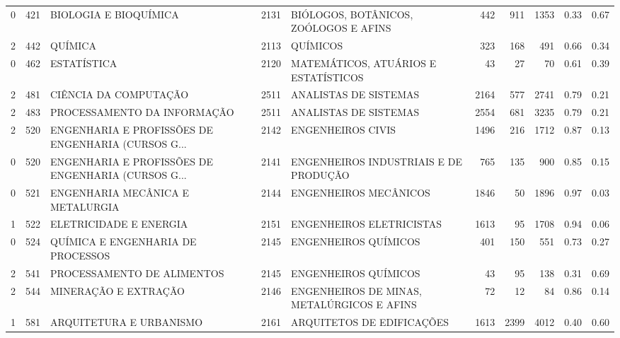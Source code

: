\begin{table}
\begin{tabular}{rrlrlrrrrr}
       0 &    421 &                              BIOLOGIA E BIOQUÍMICA & 2131 &              BIÓLOGOS, BOTÂNICOS, ZOÓLOGOS E AFINS &   442 &   911 &   1353 & 0.33 & 0.67 \\
       2 &    442 &                                            QUÍMICA & 2113 &                                           QUÍMICOS &   323 &   168 &    491 & 0.66 & 0.34 \\
       0 &    462 &                                        ESTATÍSTICA & 2120 &               MATEMÁTICOS, ATUÁRIOS E ESTATÍSTICOS &    43 &    27 &     70 & 0.61 & 0.39 \\
       2 &    481 &                              CIÊNCIA DA COMPUTAÇÃO & 2511 &                              ANALISTAS DE SISTEMAS &  2164 &   577 &   2741 & 0.79 & 0.21 \\
       2 &    483 &                        PROCESSAMENTO DA INFORMAÇÃO & 2511 &                              ANALISTAS DE SISTEMAS &  2554 &   681 &   3235 & 0.79 & 0.21 \\
       2 &    520 & ENGENHARIA E PROFISSÕES DE ENGENHARIA (CURSOS G... & 2142 &                                 ENGENHEIROS CIVIS  &  1496 &   216 &   1712 & 0.87 & 0.13 \\
       0 &    520 & ENGENHARIA E PROFISSÕES DE ENGENHARIA (CURSOS G... & 2141 &              ENGENHEIROS INDUSTRIAIS E DE PRODUÇÃO &   765 &   135 &    900 & 0.85 & 0.15 \\
       0 &    521 &                   ENGENHARIA MECÂNICA E METALURGIA & 2144 &                              ENGENHEIROS MECÂNICOS &  1846 &    50 &   1896 & 0.97 & 0.03 \\
       1 &    522 &                             ELETRICIDADE E ENERGIA & 2151 &                           ENGENHEIROS ELETRICISTAS &  1613 &    95 &   1708 & 0.94 & 0.06 \\
       0 &    524 &                  QUÍMICA E ENGENHARIA DE PROCESSOS & 2145 &                               ENGENHEIROS QUÍMICOS &   401 &   150 &    551 & 0.73 & 0.27 \\
       2 &    541 &                         PROCESSAMENTO DE ALIMENTOS & 2145 &                               ENGENHEIROS QUÍMICOS &    43 &    95 &    138 & 0.31 & 0.69 \\
       2 &    544 &                               MINERAÇÃO E EXTRAÇÃO & 2146 &         ENGENHEIROS DE MINAS, METALÚRGICOS E AFINS &    72 &    12 &     84 & 0.86 & 0.14 \\
       1 &    581 &                            ARQUITETURA E URBANISMO & 2161 &                          ARQUITETOS DE EDIFICAÇÕES &  1613 &  2399 &   4012 & 0.40 & 0.60 \\

\end{tabular}
\end{table}
